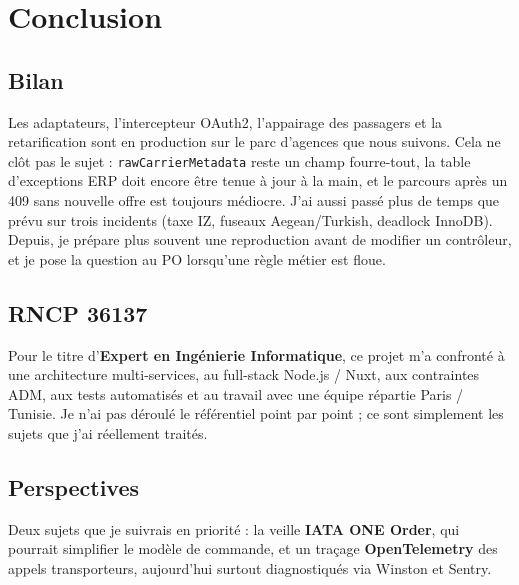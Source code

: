 \chapter{Conclusion}
\label{chap:conclusion}

\section{Bilan}

Les adaptateurs, l'intercepteur OAuth2, l'appairage des passagers et la retarification sont en production sur le parc d'agences que nous suivons. Cela ne clôt pas le sujet : \texttt{rawCarrierMetadata} reste un champ fourre-tout, la table d'exceptions ERP doit encore être tenue à jour à la main, et le parcours après un 409 sans nouvelle offre est toujours médiocre. J'ai aussi passé plus de temps que prévu sur trois incidents (taxe IZ, fuseaux Aegean/Turkish, deadlock InnoDB). Depuis, je prépare plus souvent une reproduction avant de modifier un contrôleur, et je pose la question au PO lorsqu'une règle métier est floue.

\section{RNCP 36137}

Pour le titre d'\textbf{Expert en Ingénierie Informatique}, ce projet m'a confronté à une architecture multi-services, au full-stack Node.js / Nuxt, aux contraintes ADM, aux tests automatisés et au travail avec une équipe répartie Paris / Tunisie. Je n'ai pas déroulé le référentiel point par point ; ce sont simplement les sujets que j'ai réellement traités.

\section{Perspectives}

Deux sujets que je suivrais en priorité : la veille \textbf{IATA ONE Order}, qui pourrait simplifier le modèle de commande, et un traçage \textbf{OpenTelemetry} des appels transporteurs, aujourd'hui surtout diagnostiqués via Winston et Sentry.

